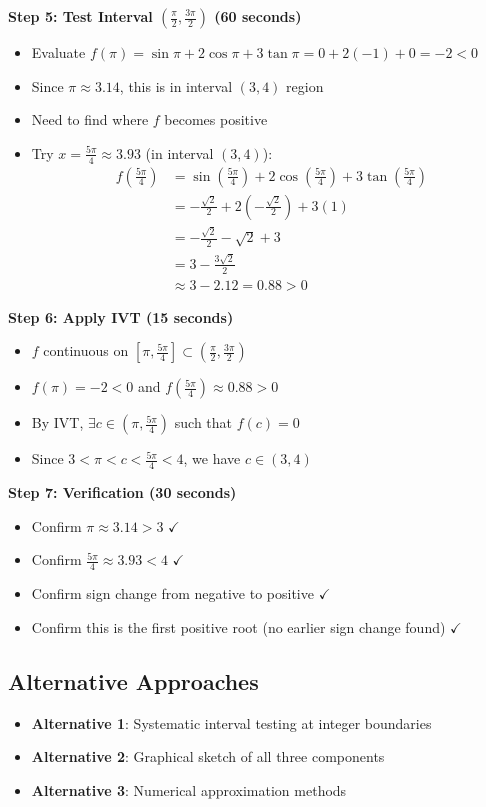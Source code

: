 \documentclass[]{article}
\begin{document}
\begin{roadmapbox}
\textbf{Step 5: Test Interval $(\frac{\pi}{2}, \frac{3\pi}{2})$ (60 seconds)}
\begin{itemize}
    \item Evaluate $f(\pi) = \sin\pi + 2\cos\pi + 3\tan\pi = 0 + 2(-1) + 0 = -2 < 0$
    \item Since $\pi \approx 3.14$, this is in interval $(3,4)$ region
    \item Need to find where $f$ becomes positive
    \item Try $x = \frac{5\pi}{4} \approx 3.93$ (in interval $(3,4)$):
    \begin{align*}
        f(\frac{5\pi}{4}) &= \sin(\frac{5\pi}{4}) + 2\cos(\frac{5\pi}{4}) + 3\tan(\frac{5\pi}{4}) \\
        &= -\frac{\sqrt{2}}{2} + 2(-\frac{\sqrt{2}}{2}) + 3(1) \\
        &= -\frac{\sqrt{2}}{2} - \sqrt{2} + 3 \\
        &= 3 - \frac{3\sqrt{2}}{2} \\
        &\approx 3 - 2.12 = 0.88 > 0
    \end{align*}
\end{itemize}

\textbf{Step 6: Apply IVT (15 seconds)}
\begin{itemize}
    \item $f$ continuous on $[\pi, \frac{5\pi}{4}] \subset (\frac{\pi}{2}, \frac{3\pi}{2})$
    \item $f(\pi) = -2 < 0$ and $f(\frac{5\pi}{4}) \approx 0.88 > 0$
    \item By IVT, $\exists c \in (\pi, \frac{5\pi}{4})$ such that $f(c) = 0$
    \item Since $3 < \pi < c < \frac{5\pi}{4} < 4$, we have $c \in (3,4)$
\end{itemize}

\textbf{Step 7: Verification (30 seconds)}
\begin{itemize}
    \item Confirm $\pi \approx 3.14 > 3$ $\checkmark$
    \item Confirm $\frac{5\pi}{4} \approx 3.93 < 4$ $\checkmark$
    \item Confirm sign change from negative to positive $\checkmark$
    \item Confirm this is the first positive root (no earlier sign change found) $\checkmark$
\end{itemize}

\subsection*{Alternative Approaches}
\begin{itemize}[leftmargin=*]
    \item \textbf{Alternative 1}: Systematic interval testing at integer boundaries
    \item \textbf{Alternative 2}: Graphical sketch of all three components
    \item \textbf{Alternative 3}: Numerical approximation methods
\end{itemize}


\end{roadmapbox}
\end{document}
